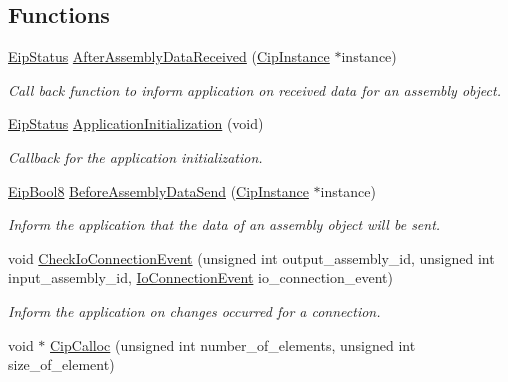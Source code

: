 \subsection*{\-Functions}
\begin{DoxyCompactItemize}
\item 
\hyperlink{typedefs_8h_a3dcc5f7837c120360f8cc88a76781709}{\-Eip\-Status} \hyperlink{group__CIP__CALLBACK__API_ga5307d18b1bd79f151588391cb4ebf30a}{\-After\-Assembly\-Data\-Received} (\hyperlink{ciptypes_8h_aea7976be629e5ece275c993982186188}{\-Cip\-Instance} $\ast$instance)
\begin{DoxyCompactList}\small\item\em \-Call back function to inform application on received data for an assembly object. \end{DoxyCompactList}\item 
\hyperlink{typedefs_8h_a3dcc5f7837c120360f8cc88a76781709}{\-Eip\-Status} \hyperlink{group__CIP__CALLBACK__API_gae93106eb1647bff3ad56a7752799d878}{\-Application\-Initialization} (void)
\begin{DoxyCompactList}\small\item\em \-Callback for the application initialization. \end{DoxyCompactList}\item 
\hyperlink{typedefs_8h_ab1d6967e091c10c240b250db768e78bc}{\-Eip\-Bool8} \hyperlink{group__CIP__CALLBACK__API_ga098272a8ae10facf3086c5c82a0080db}{\-Before\-Assembly\-Data\-Send} (\hyperlink{ciptypes_8h_aea7976be629e5ece275c993982186188}{\-Cip\-Instance} $\ast$instance)
\begin{DoxyCompactList}\small\item\em \-Inform the application that the data of an assembly object will be sent. \end{DoxyCompactList}\item 
void \hyperlink{group__CIP__CALLBACK__API_gac9c9ad2c2254b783e7b447bd84eba8c0}{\-Check\-Io\-Connection\-Event} (unsigned int output\-\_\-assembly\-\_\-id, unsigned int input\-\_\-assembly\-\_\-id, \hyperlink{ciptypes_8h_a1a7498137431124c4dde66e95095c2d2}{\-Io\-Connection\-Event} io\-\_\-connection\-\_\-event)
\begin{DoxyCompactList}\small\item\em \-Inform the application on changes occurred for a connection. \end{DoxyCompactList}\item 
void $\ast$ \hyperlink{group__CIP__CALLBACK__API_ga438b4350c32d6181990b1f0c83f2e343}{\-Cip\-Calloc} (unsigned int number\-\_\-of\-\_\-elements, unsigned int size\-\_\-of\-\_\-element)

\end{DoxyCompactItemize}
